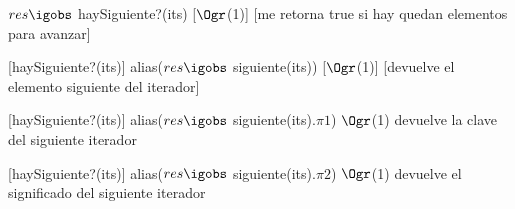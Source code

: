 \begin{Interfaz}
	{$res \igobs$ haySiguiente?(its)}
	[$\Ogr$(1)]
	[me retorna true si hay quedan elementos para avanzar]
	
	[haySiguiente?(its)]
	{alias($res \igobs$ siguiente(its))}
	[$\Ogr$(1)]
	[devuelve el elemento siguiente del iterador]
	
	[haySiguiente?(its)]
	{alias($res \igobs$ siguiente(its).$\pi1$)}
	{$\Ogr$(1)}
	{devuelve la clave del siguiente iterador}
	
	[haySiguiente?(its)]
	{alias($res \igobs$ siguiente(its).$\pi2$)}
	{$\Ogr$(1)}
	{devuelve el significado del siguiente iterador}


\end{Interfaz}
